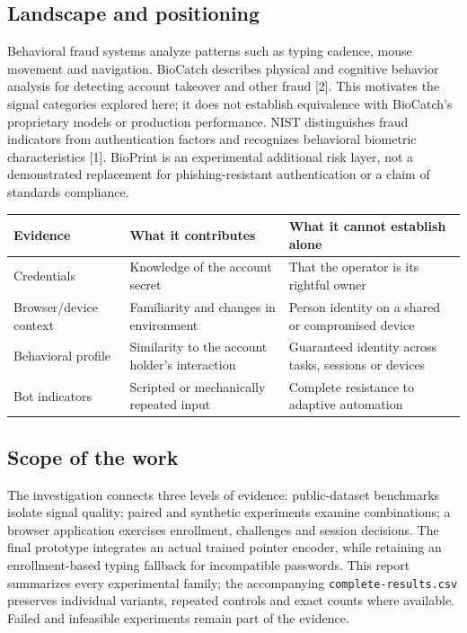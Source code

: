 \documentclass[10pt,a4paper]{article}
\begin{document}
\subsection{Landscape and positioning}
Behavioral fraud systems analyze patterns such as typing cadence, mouse movement and navigation. BioCatch describes physical and cognitive behavior analysis for detecting account takeover and other fraud [2]. This motivates the signal categories explored here; it does not establish equivalence with BioCatch's proprietary models or production performance. NIST distinguishes fraud indicators from authentication factors and recognizes behavioral biometric characteristics [1]. BioPrint is an experimental additional risk layer, not a demonstrated replacement for phishing-resistant authentication or a claim of standards compliance.

\begin{center}\small
\begin{tabularx}{\linewidth}{@{}p{29mm}XX@{}}
\toprule
\textbf{Evidence} & \textbf{What it contributes} & \textbf{What it cannot establish alone}\\\midrule
Credentials & Knowledge of the account secret & That the operator is its rightful owner\\
Browser/device context & Familiarity and changes in environment & Person identity on a shared or compromised device\\
Behavioral profile & Similarity to the account holder's interaction & Guaranteed identity across tasks, sessions or devices\\
Bot indicators & Scripted or mechanically repeated input & Complete resistance to adaptive automation\\\bottomrule
\end{tabularx}
\end{center}

\subsection{Scope of the work}
The investigation connects three levels of evidence: public-dataset benchmarks isolate signal quality; paired and synthetic experiments examine combinations; a browser application exercises enrollment, challenges and session decisions. The final prototype integrates an actual trained pointer encoder, while retaining an enrollment-based typing fallback for incompatible passwords. This report summarizes every experimental family; the accompanying \texttt{complete-results.csv} preserves individual variants, repeated controls and exact counts where available. Failed and infeasible experiments remain part of the evidence.
\end{document}
